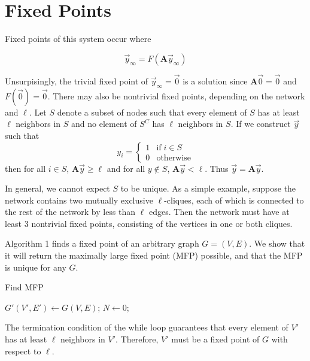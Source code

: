\documentclass[12pt]{article}
\begin{document}
\section{Fixed Points}

Fixed points of this system occur where

\begin{equation}
  \vec{y}_{\infty} = F(\mathbf{A}\vec{y}_{\infty})
\end{equation}

Unsurpisingly, the trivial fixed point of $\vec{y}_{\infty} = \vec{0}$ is a solution since $\mathbf{A}\vec{0} = \vec{0}$ and $F(\vec{0}) = \vec{0}$.  There may also be nontrivial fixed points, depending on the network and $\ell$.  Let $S$ denote a subset of nodes such that every element of $S$ has at least $\ell$ neighbors in $S$ and no element of $S^C$ has $\ell$ neighbors in $S$.  If we construct $\vec{y}$ such that  
\begin{equation}
  y_i = \begin{cases}
    1 &\text{if} \; i \in S \\
    0 &\text{otherwise}
  \end{cases}
\end{equation}
 then for all $i \in S$, $\mathbf{A}\vec{y} \geq \ell$ and for all $y \notin S$, $\mathbf{A}\vec{y} < \ell$.  Thus $\vec{y} = \mathbf{A}\vec{y}$. 

In general, we cannot expect $S$ to be unique.  As a simple example, suppose the network contains two mutually exclusive $\ell$-cliques, each of which is connected to the rest of the network by less than $\ell$ edges.  Then the network must have at least 3 nontrivial fixed points, consisting of the vertices in one or both cliques.

Algorithm 1 finds a fixed point of an arbitrary graph $G=(V,E)$.  We show that it will return the maximally large fixed point (MFP) possible, and that the MFP is unique for any $G$.

\begin{algorithm}
  \caption{Find MFP}\label{alg:two}
  $G'(V', E') \gets G(V, E)$;
  $N \gets 0$;
  \end{algorithm}

  The termination condition of the while loop guarantees that every element of $V'$ has at least $\ell$ neighbors in $V'$.  Therefore, $V'$ must be a fixed point of $G$ with respect to $\ell$.  
  
\end{document}
